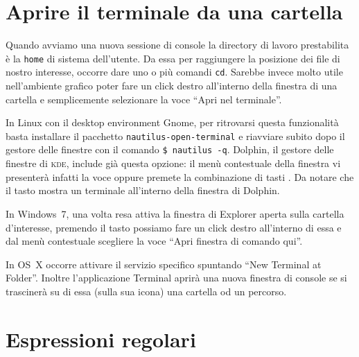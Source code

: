 \section{Aprire il terminale da una cartella}
\label{secOpenTerminalHere}

Quando avviamo una nuova sessione di console la directory di lavoro prestabilita
è la \texttt{home} di sistema dell'utente.
Da essa per raggiungere la posizione dei file di nostro interesse, occorre dare
uno o più comandi \texttt{cd}. Sarebbe invece molto utile nell'ambiente grafico
poter fare un click destro all'interno della finestra di una cartella e
semplicemente selezionare la voce ``Apri nel terminale''.

In Linux con il desktop environment Gnome, per ritrovarsi questa funzionalità
basta installare il pacchetto \texttt{nautilus-open-terminal} e riavviare
subito dopo il gestore delle finestre con il comando \texttt{\$ nautilus -q}.
Dolphin, il gestore delle finestre di \textsc{kde}, include già questa
opzione: il menù contestuale della finestra vi presenterà infatti la voce
 oppure premete la combinazione di tasti
. Da notare che il tasto  mostra un terminale
all'interno della finestra di Dolphin.

In Windows~7, una volta resa attiva la finestra di Explorer aperta sulla
cartella d'interesse, premendo il tasto \keys{\shift} possiamo fare un click
destro all'interno di essa e dal menù contestuale scegliere la voce
``Apri finestra di comando qui''.

In OS~X occorre attivare il servizio specifico  spuntando ``New Terminal at Folder''. Inoltre
l'applicazione Terminal aprirà una nuova finestra di console se si trascinerà
su di essa (sulla sua icona) una cartella od un percorso.


\section{Espressioni regolari}


